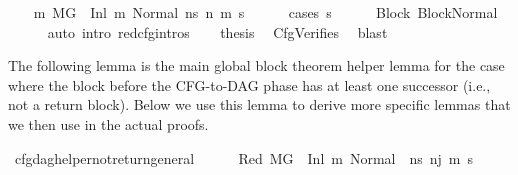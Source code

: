 \begin{isabellebody}
\ \ \isamarkupfalse%
\ {\isachardoublequoteopen}{\isasymexists}m{\isacharprime}{\kern0pt}{\isachardot}{\kern0pt}\ M{\isacharcomma}{\kern0pt}{\isasymLambda}{\isacharcomma}{\kern0pt}{\isasymGamma}{\isacharcomma}{\kern0pt}{\isasymOmega}{\isacharcomma}{\kern0pt}G\ {\isasymturnstile}\ {\isacharparenleft}{\kern0pt}Inl\ m{\isacharcomma}{\kern0pt}\ Normal\ ns{\isacharparenright}{\kern0pt}\ {\isacharminus}{\kern0pt}n{\isasymrightarrow}\ {\isacharparenleft}{\kern0pt}m{\isacharprime}{\kern0pt}{\isacharcomma}{\kern0pt}\ s{\isacharprime}{\kern0pt}{\isacharparenright}{\kern0pt}{\isachardoublequoteclose}\isanewline
\ \ \ \ \isamarkupfalse%
\ {\isacharparenleft}{\kern0pt}cases\ s{\isacharprime}{\kern0pt}{\isacharparenright}{\kern0pt}\isanewline
\ \ \ \ \isamarkupfalse%
\ Block\ BlockNormal\isanewline
\ \ \ \ \isamarkupfalse%
\ {\isacharparenleft}{\kern0pt}auto\ intro{\isacharcolon}{\kern0pt}\ red{\isacharunderscore}{\kern0pt}cfg{\isachardot}{\kern0pt}intros{\isacharparenright}{\kern0pt}\isanewline
\ \ \isamarkupfalse%
\ {\isacharquery}{\kern0pt}thesis\ \isamarkupfalse%
\ CfgVerifies\ \isamarkupfalse%
\ blast\isanewline
{}\isamarkupfalse%
%
\endisatagproof
{\isafoldproof}%
%
\isadelimproof
%
\endisadelimproof
%
\begin{isamarkuptext}%
The following lemma is the main global block theorem helper lemma for the case where the block
before the CFG-to-DAG phase has at least one successor (i.e., not a return block). Below we use this
lemma to derive more specific lemmas that we then use in the actual proofs.%
\end{isamarkuptext}\isamarkuptrue%
\isamarkupfalse%
\ cfg{\isacharunderscore}{\kern0pt}dag{\isacharunderscore}{\kern0pt}helper{\isacharunderscore}{\kern0pt}not{\isacharunderscore}{\kern0pt}return{\isacharunderscore}{\kern0pt}general{\isacharcolon}{\kern0pt}\isanewline
\ \ \isanewline
\ \ \ Red{\isacharcolon}{\kern0pt}\ {\isachardoublequoteopen}M{\isacharcomma}{\kern0pt}{\isasymLambda}{\isacharcomma}{\kern0pt}{\isasymGamma}{\isacharcomma}{\kern0pt}{\isasymOmega}{\isacharcomma}{\kern0pt}G{}\ {\isasymturnstile}\ {\isacharparenleft}{\kern0pt}Inl\ m{}{\isacharcomma}{\kern0pt}\ {\isacharparenleft}{\kern0pt}Normal\ \ ns{}{\isacharparenright}{\kern0pt}{\isacharparenright}{\kern0pt}\ {\isacharminus}{\kern0pt}n{\isasymrightarrow}{\isacharcircum}{\kern0pt}j\ {\isacharparenleft}{\kern0pt}m{\isacharprime}{\kern0pt}{\isacharcomma}{\kern0pt}\ s{\isacharprime}{\kern0pt}{\isacharparenright}{\kern0pt}{\isachardoublequoteclose}\ \isanewline

\end{isabellebody}
